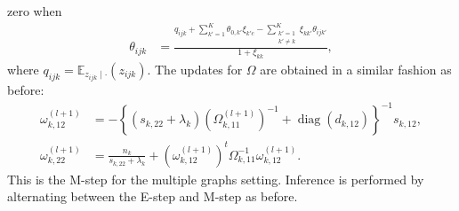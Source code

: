 \documentclass[a4paper, 11pt, oneside]{report}
\DeclareMathOperator{\diag}{diag}
\newcommand{\E}{\mathbb{E}}
\newcommand{\1}{\mathds{1}}
\newcommand{\inv}{^{-1}}
\begin{document}
zero when
\begin{align*}
	\theta_{ijk} & = \frac{q_{ijk} + \sum_{k'=1}^K \theta_{0,k'} \xi_{k'c} - \sum_{\substack{k'=1 \\ k' \neq k}}^K \xi_{k k'}\theta_{ijk'}}{ 1 + \xi_{kk}},
\end{align*}
where $q_{ijk} = \E_{z_{ijk} \mid \cdot}(z_{ijk})$.
The updates for $\Omega$ are obtained in a similar fashion as before:
\begin{align*}
	\omega_{k,12}^{(l+1)}  & = -\left\{(s_{k, 22} + \lambda_k) \left(\Omega_{k, 11}^{(l+1)}\right)\inv + \diag(d_{k, 12})\right\}\inv s_{k, 12},  \\
	\omega_{k, 22}^{(l+1)} & = \frac{n_k}{s_{k,22} + \lambda_k} + \left(\omega_{k,12}^{(l+1)}\right)^t \Omega_{k, 11}\inv \omega_{k, 12}^{(l+1)}.
\end{align*}
This is the M-step for the multiple graphs setting. Inference is performed by
alternating between the E-step and M-step as before.
\end{document}
